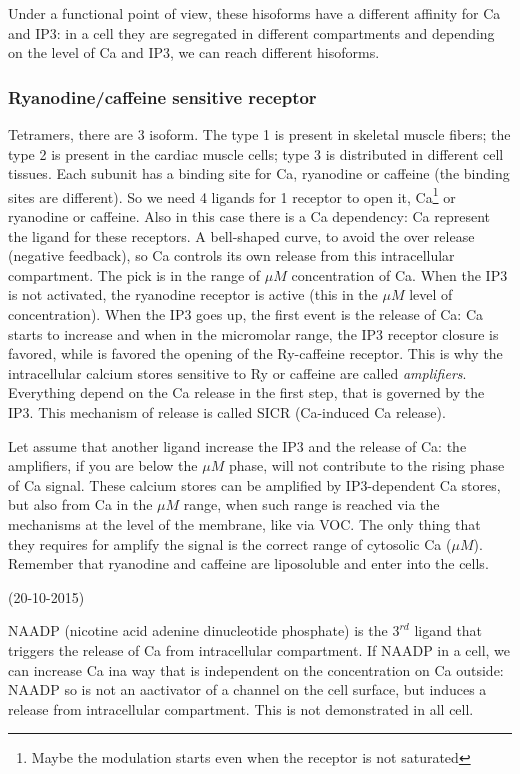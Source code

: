 \documentclass[a4paper, 12pt]{book}
\begin{document}
 Under a functional point of view, these hisoforms have a different affinity for Ca and IP3: in a cell they are segregated in different compartments and depending on the level of Ca and IP3, we can reach different hisoforms. 

\subsubsection{Ryanodine/caffeine sensitive receptor}
Tetramers, there are 3 isoform. The type 1 is present in skeletal muscle fibers; the type 2 is present in the cardiac muscle cells; type 3 is distributed in different cell tissues. 
Each subunit has a binding site for Ca, ryanodine or caffeine (the binding sites are different). So we need 4 ligands for 1 receptor to open it, Ca\footnote{Maybe the modulation starts even when the receptor is not saturated} or ryanodine or caffeine. Also in this case there is a Ca dependency: Ca represent the ligand for these receptors. A bell-shaped curve, to avoid the over release (negative feedback), so Ca controls its own release from this intracellular compartment. The pick is in the range of $\mu M$ concentration of Ca. When the IP3 is not activated, the ryanodine receptor is active (this in the $\mu M$ level of concentration). When the IP3 goes up, the first event is the release of Ca: Ca starts to increase and when in the micromolar range, the IP3 receptor closure is favored, while is favored the opening of the Ry-caffeine receptor. This is why the intracellular calcium stores sensitive to Ry or caffeine are called \emph{amplifiers}. Everything depend on the Ca release in the first step, that is governed by the IP3. This mechanism of release is called SICR (Ca-induced Ca release). 


Let assume that another ligand increase the IP3 and the release of Ca: the amplifiers, if you are below the $\mu M$ phase, will not contribute to the rising phase of Ca signal. These calcium stores can be amplified by IP3-dependent Ca stores, but also from Ca in the $\mu M$ range, when such range is reached via the mechanisms at the level of the membrane, like via VOC. The only thing that they requires for amplify the signal is the correct range of cytosolic Ca ($\mu M$). Remember that ryanodine and caffeine are liposoluble and enter into the cells. 

(20-10-2015)

NAADP (nicotine acid adenine dinucleotide phosphate) is the $3^{rd}$ ligand that triggers the release of Ca from intracellular compartment. If NAADP in a cell, we can increase Ca ina way that is independent on the concentration on Ca outside: NAADP so is not an aactivator of a channel on the cell surface, but induces a release from intracellular compartment. This is not demonstrated in all cell.
\end{document}
